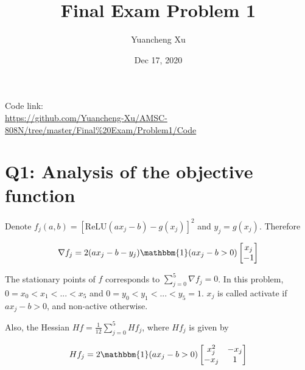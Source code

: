 \documentclass{article}
\title{Final Exam Problem 1 }
\author{Yuancheng Xu}
\date{Dec 17, 2020}
\newcommand{\ReLU}{\text{ReLU}}
\begin{document}
\maketitle

\noindent Code link:\\
\url{https://github.com/Yuancheng-Xu/AMSC-808N/tree/master/Final%20Exam/Problem1/Code}\\

\section*{Q1: Analysis of the objective function}
Denote $ f_j(a,b) = [\ReLU(ax_j-b)-g(x_j)]^2 $ and $ y_j = g(x_j) $. Therefore 

\begin{equation} \label{eq: grad fj}
	\nabla f_j = 2(ax_j-b-y_j) \mathbbm{1}(ax_j-b>0) 
	\begin{bmatrix}
		x_j \\ -1
	\end{bmatrix}
\end{equation}

The stationary points of $ f $ corresponds to $ \sum_{j=0}^{5}\nabla f_j = 0 $. In this problem, $ 0 = x_0 < x_1 <...<x_5 $ and $ 0=y_0<y_1<...<y_5 = 1$. $ x_j $ is called activate if $ ax_j -b >0 $, and non-active otherwise.

Also, the Hessian $ Hf = \frac{1}{12}\sum_{j=0}^{5}Hf_j $, where $ Hf_j $ is given by

\begin{equation}
	Hf_j = 2 \mathbbm{1}(ax_j-b>0) 
	\begin{bmatrix}
		x_j^2 & -x_j \\ -x_j & 1
	\end{bmatrix}
\end{equation}
\end{document}
